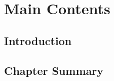 \chapter{Main Contents}
\label{c:03_main}

\section{Introduction}



\section{Chapter Summary}






